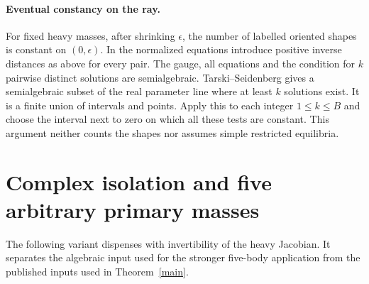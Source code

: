 \documentclass[11pt]{article}
\begin{document}
\paragraph{Eventual constancy on the ray.}
For fixed heavy masses, after shrinking $\epsilon$, the number of labelled oriented shapes is constant on $(0,\epsilon)$. In the normalized equations introduce positive inverse distances as above for every pair. The gauge, all equations and the condition for $k$ pairwise distinct solutions are semialgebraic. Tarski--Seidenberg gives a semialgebraic subset of the real parameter line where at least $k$ solutions exist. It is a finite union of intervals and points. Apply this to each integer $1\le k\le B$ and choose the interval next to zero on which all these tests are constant. This argument neither counts the shapes nor assumes simple restricted equilibria.

\section{Complex isolation and five arbitrary primary masses}
The following variant dispenses with invertibility of the heavy Jacobian. It separates the algebraic input used for the stronger five-body application from the published inputs used in Theorem~\ref{main}.
\end{document}
